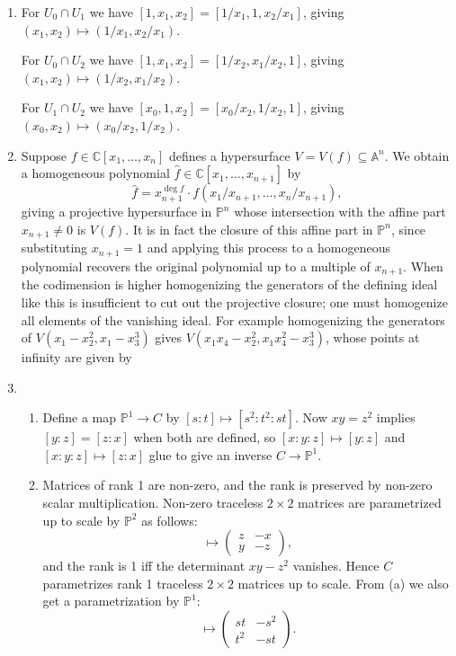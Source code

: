 \documentclass[a4paper]{article}
\theoremstyle{definition}
\theoremstyle{remark}
\renewcommand{\P}{\mathbb{P}}
\newcommand{\A}{\mathbb{A}}
\newcommand{\C}{\mathbb{C}}
\begin{document}
\begin{enumerate}
\item
For $U_0\cap U_1$ we have $[1,x_1,x_2]=[1/x_1,1,x_2/x_1]$, giving
$(x_1,x_2)\mapsto(1/x_1,x_2/x_1)$.

For $U_0\cap U_2$ we have $[1,x_1,x_2]=[1/x_2,x_1/x_2,1]$, giving
$(x_1,x_2)\mapsto(1/x_2,x_1/x_2)$.

For $U_1\cap U_2$ we have $[x_0,1,x_2]=[x_0/x_2,1/x_2,1]$, giving
$(x_0,x_2)\mapsto(x_0/x_2,1/x_2)$.

\item
Suppose $f\in\C[x_1,\ldots,x_n]$ defines a hypersurface $V=V(f)\subseteq\A^n$.
We obtain a homogeneous polynomial $\hat f\in\C[x_1,\ldots,x_{n+1}]$ by
\begin{equation*}
    \hat f = x_{n+1}^{\deg f}\cdot f(x_1/x_{n+1},\ldots,x_n/x_{n+1}),
\end{equation*}
giving a projective hypersurface in $\P^n$ whose intersection with the affine
part $x_{n+1}\ne0$ is $V(f)$. It is in fact the closure of this affine part in
$\P^n$, since substituting $x_{n+1}=1$ and applying this process to a
homogeneous polynomial recovers the original polynomial up to a multiple of
$x_{n+1}$. When the codimension is higher homogenizing the generators of the
defining ideal like this is insufficient to cut out the projective closure; one
must homogenize all elements of the vanishing ideal. For example homogenizing
the generators of $V(x_1-x_2^2,x_1-x_3^3)$ gives
$V(x_1x_4-x_2^2,x_1x_4^2-x_3^3)$, whose points at infinity are given by

\item
\begin{enumerate}[label=(\alph*)]

\item 
Define a map $\P^1\to C$ by $[s:t]\mapsto[s^2:t^2:st]$. Now $xy=z^2$ implies
$[y:z]=[z:x]$ when both are defined, so $[x:y:z]\mapsto[y:z]$ and
$[x:y:z]\mapsto[z:x]$ glue to give an inverse $C\to\P^1$.

\item
Matrices of rank 1 are non-zero, and the rank is preserved by non-zero scalar
multiplication. Non-zero traceless $2\times2$ matrices are parametrized up to
scale by $\P^2$ as follows:
\begin{equation*}
    [x:y:z] \mapsto \begin{pmatrix}
        z & -x \\ y & -z
    \end{pmatrix},
\end{equation*}
and the rank is 1 iff the determinant $xy-z^2$ vanishes. Hence $C$ parametrizes
rank 1 traceless $2\times2$ matrices up to scale. From (a) we also get a
parametrization by $\P^1$:
\begin{equation*}
    [s:t] \mapsto \begin{pmatrix}
        st & -s^2 \\ t^2 & -st
    \end{pmatrix}.
\end{equation*}


\end{enumerate}
\end{enumerate}
\end{document}
